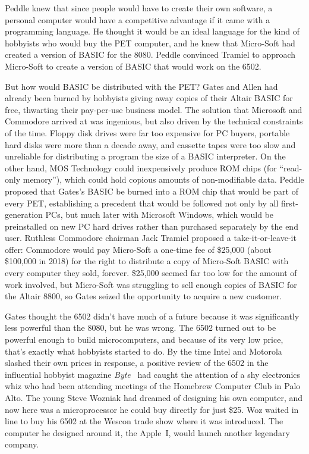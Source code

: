Peddle knew that since people would have to create their own software,
a personal computer would have a competitive advantage if it came with
a programming language.
He thought it would be an ideal language for the kind of hobbyists
who would buy the PET computer, and he knew that Micro-Soft had
created a version of BASIC for the 8080.
Peddle convinced Tramiel to approach Micro-Soft to create a version of
BASIC that would work on the 6502.


But how would BASIC be distributed with the PET?
Gates and Allen had already been burned by hobbyists giving away
copies of their Altair BASIC for free, thwarting their pay-per-use
business model.
The solution that Microsoft and Commodore arrived at was ingenious,
but also driven by the technical constraints of the time.
Floppy disk drives were far too expensive for PC buyers, portable hard
disks were more than a decade away, and cassette tapes were too slow
and unreliable for distributing a program the size of a BASIC
interpreter.
On the other hand, MOS Technology could inexpensively produce ROM
chips (for ``read-only memory''), which could hold copious amounts of
non-modifiable data.
Peddle proposed that Gates's BASIC be burned into a ROM chip that
would be part of every PET, establishing a precedent that would be
followed not only by all first-generation PCs, but much later with
Microsoft Windows, which would be preinstalled on new PC hard drives
rather than purchased separately by the end user.
Ruthless Commodore chairman Jack Tramiel proposed a
take-it-or-leave-it offer: Commodore would pay Micro-Soft a one-time
fee of \$25,000 (about \$100,000 in 2018) for the right to distribute
a copy of Micro-Soft BASIC with every computer they sold, forever.
\$25,000 seemed far too low for the amount of work involved, but
Micro-Soft was struggling to sell enough copies of BASIC for the
Altair 8800, so Gates seized the opportunity to acquire a new
customer.


Gates thought the 6502 didn't have much of a future because it was
significantly less powerful than the 8080, but he was wrong.
The 6502 turned out to be powerful enough to build microcomputers, and
because of its very low price, that's exactly what hobbyists started
to do.
By the time Intel and Motorola 
slashed their own prices in response,
a positive review of the 6502 in the influential hobbyist magazine
\emph{Byte}~\cite{byte75:6502} had caught the attention of a shy
electronics whiz who had been attending meetings of the Homebrew
Computer Club in Palo Alto.
The young Steve Wozniak had dreamed of designing his own computer,
and now here was a microprocessor he could buy directly for just \$25.
Woz waited in line to buy his 6502 at the Wescon trade show where it was
introduced.  The computer he designed around it, the Apple~I,
would launch another legendary company.

